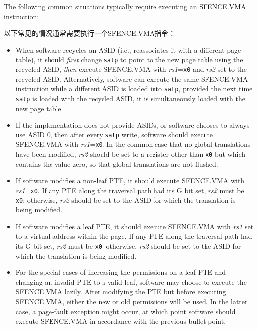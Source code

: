 \begin{commentary}

The following common situations typically require executing an
SFENCE.VMA instruction:  

以下常见的情况通常需要执行一个SFENCE.VMA指令：

\vspace{-0.1in}
\begin{itemize}

\item When software recycles an ASID (i.e., reassociates it with a different
page table), it should {\em first} change {\tt satp} to point to the new page
table using the recycled ASID, {\em then} execute SFENCE.VMA with {\em
rs1}={\tt x0} and {\em rs2} set to the recycled ASID.  Alternatively, software
can execute the same SFENCE.VMA instruction while a different ASID is loaded
into {\tt satp}, provided the next time {\tt satp} is loaded with the recycled
ASID, it is simultaneously loaded with the new page table.

\item If the implementation does not provide ASIDs, or software chooses to
always use ASID 0, then after every {\tt satp} write, software should execute
SFENCE.VMA with {\em rs1}={\tt x0}.  In the common case that no global
translations have been modified, {\em rs2} should be set to a register other than
{\tt x0} but which contains the value zero, so that global translations are
not flushed.

\item If software modifies a non-leaf PTE, it should execute SFENCE.VMA with
{\em rs1}={\tt x0}.  If any PTE along the traversal path had its G bit set,
{\em rs2} must be {\tt x0}; otherwise, {\em rs2} should be set to the ASID for
which the translation is being modified.

\item If software modifies a leaf PTE, it should execute SFENCE.VMA with {\em
rs1} set to a virtual address within the page.  If any PTE along the traversal
path had its G bit set, {\em rs2} must be {\tt x0}; otherwise, {\em rs2}
should be set to the ASID for which the translation is being modified.

\item For the special cases of increasing the permissions on a leaf PTE and
changing an invalid PTE to a valid leaf, software may choose to execute
the SFENCE.VMA lazily.  After modifying the PTE but before executing
SFENCE.VMA, either the new or old permissions will be used.  In the latter
case, a page-fault exception might occur, at which point software should
execute SFENCE.VMA in accordance with the previous bullet point.


\end{itemize}
\end{commentary}
